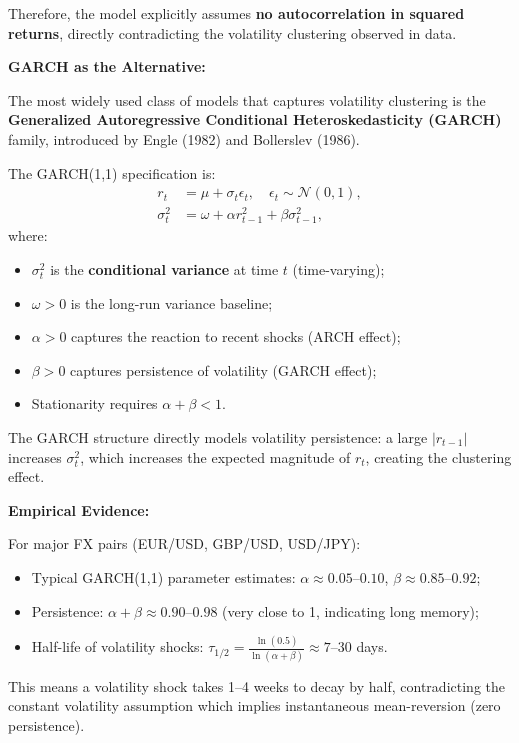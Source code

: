 Therefore, the model explicitly assumes \textbf{no autocorrelation in squared returns}, directly contradicting the volatility clustering observed in data.

\textbf{GARCH as the Alternative:}

The most widely used class of models that captures volatility clustering is the \textbf{Generalized Autoregressive Conditional Heteroskedasticity (GARCH)} family, introduced by Engle (1982) and Bollerslev (1986).

The GARCH(1,1) specification is:
\begin{align}
	r_t &= \mu + \sigma_t \epsilon_t, \quad \epsilon_t \sim \mathcal{N}(0,1), \\
	\sigma_t^2 &= \omega + \alpha r_{t-1}^2 + \beta \sigma_{t-1}^2,
\end{align}
where:
\begin{itemize}
	\item $\sigma_t^2$ is the \textbf{conditional variance} at time $t$ (time-varying);
	\item $\omega > 0$ is the long-run variance baseline;
	\item $\alpha > 0$ captures the reaction to recent shocks (ARCH effect);
	\item $\beta > 0$ captures persistence of volatility (GARCH effect);
	\item Stationarity requires $\alpha + \beta < 1$.
\end{itemize}

The GARCH structure directly models volatility persistence: a large $|r_{t-1}|$ increases $\sigma_t^2$, which increases the expected magnitude of $r_t$, creating the clustering effect.

\textbf{Empirical Evidence:}

For major FX pairs (EUR/USD, GBP/USD, USD/JPY):
\begin{itemize}
	\item Typical GARCH(1,1) parameter estimates: $\alpha \approx 0.05$--$0.10$, $\beta \approx 0.85$--$0.92$;
	\item Persistence: $\alpha + \beta \approx 0.90$--$0.98$ (very close to 1, indicating long memory);
	\item Half-life of volatility shocks: $\tau_{1/2} = \frac{\ln(0.5)}{\ln(\alpha + \beta)} \approx 7$--30 days.
\end{itemize}

This means a volatility shock takes 1--4 weeks to decay by half, contradicting the constant volatility assumption which implies instantaneous mean-reversion (zero persistence).

